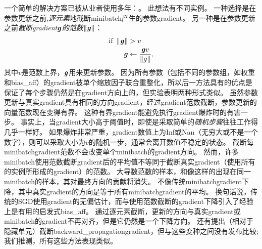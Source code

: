 
一个简单的解决方案已被从业者使用多年：。
此想法有不同实例\citep{Mikolov-thesis-2012,Pascanu+al-ICML2013-small}。
一种选择是在参数更新之前,\emph{逐元素}地截断\gls{minibatch}产生的参数\gls{gradient}\citep{Mikolov-thesis-2012}。
另一种是在参数更新之前\emph{截断\gls{gradient}$\boldsymbol{\mathit{g}}$的范数$\left\lVert \boldsymbol{\mathit{g}} \right\rVert$}\citep{Pascanu+al-ICML2013-small}：
\begin{align}
 \text{if}~ \left\lVert\boldsymbol{\mathit{g}}\right\rVert &> v \\
 \boldsymbol{\mathit{g}} &\gets \frac{\boldsymbol{\mathit{g}} v}{\left\lVert g\right\rVert},
\end{align}
其中$v$是范数上界，$\boldsymbol{\mathit{g}}$用来更新参数。
因为所有参数（包括不同的参数组，如权重和\gls{bias_aff}）的\gls{gradient}被单个缩放因子联合重整化，所以后一方法具有的优点是保证了每个步骤仍然是在\gls{gradient}方向上的，但实验表明两种形式类似。
虽然参数更新与真实\gls{gradient}具有相同的方向\gls{gradient}，经过\gls{gradient}范数截断，参数更新的向量范数现在变得有界。
这种有界\gls{gradient}能避免执行\gls{gradient}爆炸时的有害一步。
事实上，当\gls{gradient}大小高于阈值时，即使是采取简单的\emph{随机步骤}往往工作得几乎一样好。
如果爆炸非常严重，\gls{gradient}数值上为Inf或Nan（无穷大或不是一个数字），则可以采取大小为$v$的随机一步，通常会离开数值不稳定的状态。
截断每\gls{minibatch}\gls{gradient}范数不会改变单个\gls{minibatch}的\gls{gradient}方向。
然而，许多\gls{minibatch}使用范数截断\gls{gradient}后的平均值不等同于截断真实\gls{gradient}（使用所有的实例所形成的\gls{gradient}）的范数。
大导数范数的样本，和像这样的出现在同一\gls{minibatch}的样本，其对最终方向的贡献将消失。
不像传统\gls{minibatch}\gls{gradient}下降，其中真实\gls{gradient}的方向是等于所有\gls{minibatch}\gls{gradient}的平均。
换句话说，传统的\gls{SGD}使用\gls{gradient}的无偏估计，而与使用范数截断的\gls{gradient}下降引入了经验上是有用的启发式\gls{bias_aff}。
通过逐元素截断，更新的方向与真实\gls{gradient}或\gls{minibatch}的\gls{gradient}不再对齐，但是它仍然是一个下降方向。
还有提出\citep{Graves-arxiv2013}（相对于隐藏单元）截断\gls{backward_propagation}\gls{gradient}，但与这些变种之间没有发布比较; 我们推测，所有这些方法表现类似。


